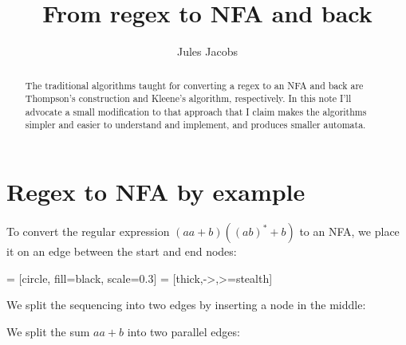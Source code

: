 \documentclass[a4paper, 11pt]{article}
\title{From regex to NFA and back}
\author{Jules Jacobs}
\theoremstyle{definition}
\begin{document}
\maketitle

\begin{abstract}
  The traditional algorithms taught for converting a regex to an NFA and back are Thompson's construction and Kleene's algorithm, respectively. In this note I'll advocate a small modification to that approach that I claim makes the algorithms simpler and easier to understand and implement, and produces smaller automata.
\end{abstract}


\section{Regex to NFA by example}

To convert the regular expression $(aa+b)((ab)^* + b)$ to an NFA, we place it on an edge between the start and end nodes:

 = [circle, fill=black, scale=0.3]
 = [thick,->,>=stealth]
\newcommand{\state}[2]{\node[n] at (#1) (#2) {};}
\newcommand{\edge}[3]{\draw [arrow] (#1) -- (#2) node[midway,above] {#3};}
\newcommand{\edgeb}[4]{\draw [arrow, bend #4] (#1) edge (#2) node[midway,above] {#3};}

\begin{center}
\end{center}

\noindent We split the sequencing into two edges by inserting a node in the middle:

\begin{center}
\end{center}

\noindent We split the sum $aa + b$ into two parallel edges:

\begin{center}
\end{center}
\end{document}
